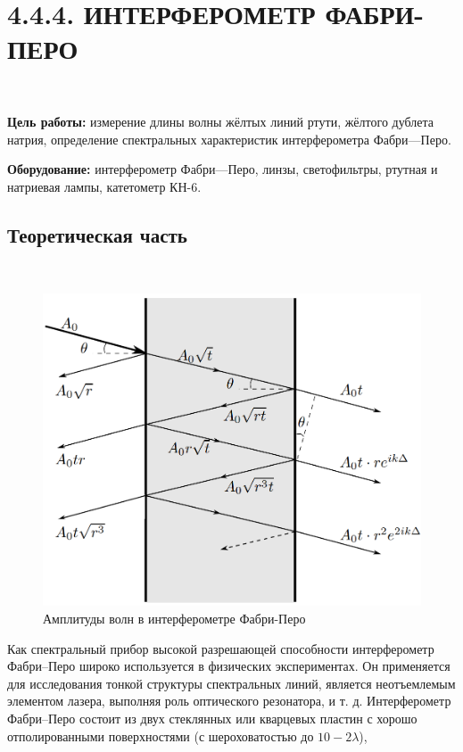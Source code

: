 \documentclass[12pt]{article}
\begin{document}
    \section*{4.4.4. ИНТЕРФЕРОМЕТР ФАБРИ-ПЕРО}
    \ \par
    \textbf{Цель работы:} измерение длины волны жёлтых линий ртути, жёлтого дублета натрия,
    определение спектральных характеристик интерферометра Фабри—Перо.

    \textbf{Оборудование:} интерферометр Фабри—Перо, линзы, светофильтры, ртутная и натриевая лампы, катетометр КН-6.

    \subsection*{Теоретическая часть}
    \ \par
    \begin{figure}
        \includegraphics[width=\linewidth]{pic/ifp}
        \caption{Амплитуды волн в интерферометре Фабри-Перо}
        \label{fig:fig1}
    \end{figure}
    Как спектральный прибор высокой разрешающей способности
    интерферометр Фабри–Перо широко используется в физических экспериментах.
    Он применяется для исследования тонкой структуры спектральных линий,
    является неотъемлемым элементом лазера, выполняя роль оптического резонатора, и т. д.
    Интерферометр Фабри–Перо состоит из двух стеклянных или кварцевых пластин
    с хорошо отполированными поверхностями (с шероховатостью до $10-2\lambda$),
\end{document}
